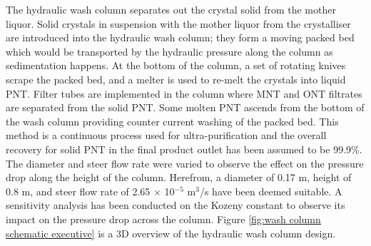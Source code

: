 

The hydraulic wash column separates out the crystal solid from the mother liquor. Solid crystals in suspension with the mother liquor from the crystalliser are introduced into the hydraulic wash column; they form a moving packed bed which would be transported by the hydraulic pressure along the column as sedimentation happens. At the bottom of the column, a set of rotating knives scrape the packed bed, and a melter is used to re-melt the crystals into liquid PNT. Filter tubes are implemented in the column where MNT and ONT filtrates are separated from the solid PNT. Some molten PNT ascends from the bottom of the wash column providing counter current washing of the packed bed. This method is a continuous process used for ultra-purification and the overall recovery for solid PNT in the final product outlet has been assumed to be 99.9\%. The diameter and steer flow rate were varied to observe the effect on the pressure drop along the height of the column. Herefrom, a diameter of 0.17 m, height of 0.8 m, and steer flow rate of 2.65 $\times$ 10$^{-5}$ m$^{3}$/s have been deemed suitable. A sensitivity analysis has been conducted on the Kozeny constant to observe its impact on the pressure drop across the column. Figure \ref{fig:wash column schematic executive} is a 3D overview of the hydraulic wash column design.



